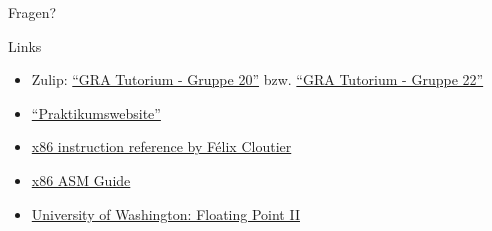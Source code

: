 \begin{frame}[c]{}{}
	\begin{center}
		\LARGE Fragen?
	\end{center}
\end{frame}

\begin{frame}[fragile, c]{Links}{}
	\begin{itemize}
		\item Zulip: \href{https://zulip.in.tum.de/#narrow/stream/2267-GRA-Tutorium---Gruppe-20}{\enquote{GRA Tutorium - Gruppe 20}}
		      bzw. \href{https://zulip.in.tum.de/#narrow/stream/2269-GRA-Tutorium---Gruppe-22}{\enquote{GRA Tutorium - Gruppe 22}}
		\item \href{https://gra.caps.in.tum.de}{\enquote{Praktikumswebsite}}
		\item \href{https://www.felixcloutier.com/x86/}{x86 instruction reference by Félix Cloutier}
		\item \href{https://flint.cs.yale.edu/cs421/papers/x86-asm/asm.html}{x86 ASM Guide}
		\item \href{https://courses.cs.washington.edu/courses/cse351/19wi/lectures/07/CSE351-L07-fp-II-x86intro-19wi.pdf}{University of Washington: Floating Point II}
	\end{itemize}
\end{frame}

\maketitle


